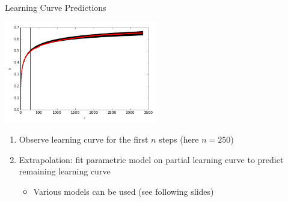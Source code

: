 \begin{frame}{Learning Curve Predictions}

\centering
\includegraphics[width=0.5\textwidth]{images/learningcurve/learning_curve_single_pred.jpg}

\begin{enumerate}
  \item Observe learning curve for the first $n$ steps (here $n=250$)
  \pause
  \item \alert{Extrapolation}: fit parametric model on partial learning curve to predict remaining learning curve
  \pause
  \begin{itemize}
      \item Various models can be used (see following slides) 
  \end{itemize}
  
  
\end{enumerate}

\end{frame}

